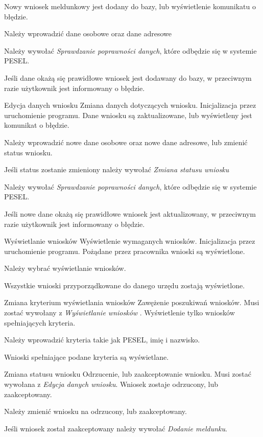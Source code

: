\documentclass[12pt]{article}
\begin{document}
    {Nowy wniosek meldunkowy jest dodany do bazy, lub wyświetlenie komunikatu o błędzie.}
    {
        \item Należy wprowadzić dane osobowe oraz dane adresowe
        \item Należy wywołać \textit{Sprawdzanie poprawności danych}, które odbędzie się w systemie PESEL.
        \item Jeśli dane okażą się prawidłowe wniosek jest dodawany do bazy, w przeciwnym razie użytkownik jest informowany o błędzie.
    }
\scenario
    {Edycja danych wniosku}
    {Zmiana danych dotyczących wniosku.}
    {Inicjalizacja przez uruchomienie programu.}
    {Dane wniosku są zaktualizowane, lub wyświetleny jest komunikat o błędzie.}
    {
        \item Należy wprowadzić nowe dane osobowe oraz nowe dane adresowe, lub zmienić status wniosku.
        \item Jeśli status zostanie zmieniony należy wywołać \textit{Zmiana statusu wniosku}
        \item Należy wywołać \textit{Sprawdzanie poprawności danych}, które odbędzie się w systemie PESEL.
        \item Jeśli nowe dane okażą się prawidłowe wniosek jest aktualizowany, w przeciwnym razie użytkownik jest informowany o błędzie.
    }
\scenario
    {Wyświetlanie wniosków}
    {Wyświetlenie wymaganych wniosków.}
    {Inicjalizacja przez uruchomienie programu.}
    {Pożądane przez pracownika wnioski są wyświetlone.}
    {
        \item Należy wybrać wyświetlanie wniosków.
        \item Wszystkie wnioski przyporządkowane do danego urzędu zostają wyświetlone.
    }
\scenario
    {Zmiana kryterium wyświetlania wniosków}
    {Zawężenie poszukiwań wniosków.}
    {Musi zostać wywołany z \textit{Wyświetlanie wniosków} .}
    {Wyświetlenie tylko wniosków spełniających kryteria.}
    {
        \item Należy wprowadzić kryteria takie jak PESEL, imię i nazwisko.
        \item Wnioski spełniające podane kryteria są wyświetlane.
    }
\scenario
    {Zmiana statusu wniosku}
    {Odrzucenie, lub zaakceptowanie wniosku.}
    {Musi zostać wywołana z \textit{Edycja danych wniosku}.}
    {Wniosek zostaje odrzucony, lub zaakceptowany.}
    {
        \item Należy zmienić wniosku na odrzucony, lub zaakceptowany.
        \item Jeśli wniosek został zaakceptowany należy wywołać \textit{Dodanie meldunku}.
    }
\end{document}
